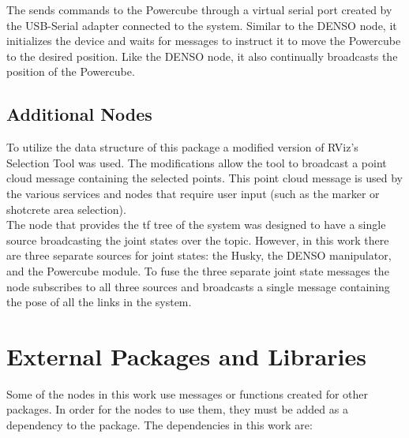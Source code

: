 The  sends commands to the Powercube through a virtual serial port created by the USB-Serial adapter connected to the system. Similar to the DENSO node, it initializes the device and waits for  messages to instruct it to move the Powercube to the desired position. Like the DENSO node, it also continually broadcasts the position of the Powercube.\\
 
\subsection{Additional Nodes}
To utilize the data structure of this package a modified version of RViz's Selection Tool was used. The modifications allow the tool to broadcast a point cloud message containing the selected points. This point cloud message is used by the various services and nodes that require user input (such as the marker or shotcrete area selection).\\

The  node that provides the tf tree of the system was designed to have a single source broadcasting the joint states over the  topic. However, in this work there are three separate sources for joint states: the Husky, the DENSO manipulator, and the Powercube module. To fuse the three separate joint state messages the  node subscribes to all three sources and broadcasts a single message containing the pose of all the links in the system.\\
\section{External Packages and Libraries}
\label{sec:extpkg}
Some of the nodes in this work use messages or functions created for other packages. In order for the nodes to use them, they must be added as a dependency to the package. The dependencies in this work are:

